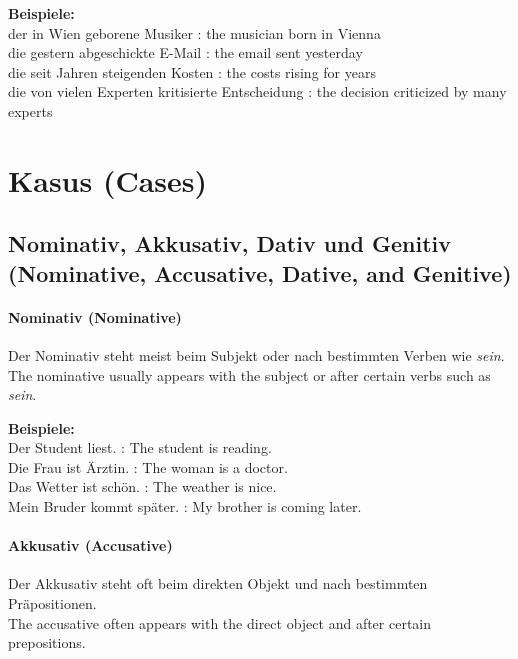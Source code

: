 \documentclass[a4paper]{article}
\begin{document}
            \textbf{Beispiele:}\\
            der in Wien geborene Musiker : the musician born in Vienna\\
            die gestern abgeschickte E-Mail : the email sent yesterday\\
            die seit Jahren steigenden Kosten : the costs rising for years\\
            die von vielen Experten kritisierte Entscheidung : the decision criticized by many experts
    
    
    \section{Kasus {\small (Cases)}}
    
    \subsection{Nominativ, Akkusativ, Dativ und Genitiv {\small (Nominative, Accusative, Dative, and Genitive)}}
        
        \paragraph{Nominativ {\small (Nominative)}}
            Der Nominativ steht meist beim Subjekt oder nach bestimmten Verben wie \textit{sein}.\\
            The nominative usually appears with the subject or after certain verbs such as \textit{sein}.
            
            \textbf{Beispiele:}\\
            Der Student liest. : The student is reading.\\
            Die Frau ist Ärztin. : The woman is a doctor.\\
            Das Wetter ist schön. : The weather is nice.\\
            Mein Bruder kommt später. : My brother is coming later.
        
        \paragraph{Akkusativ {\small (Accusative)}}
            Der Akkusativ steht oft beim direkten Objekt und nach bestimmten Präpositionen.\\
            The accusative often appears with the direct object and after certain prepositions.
            
\end{document}
